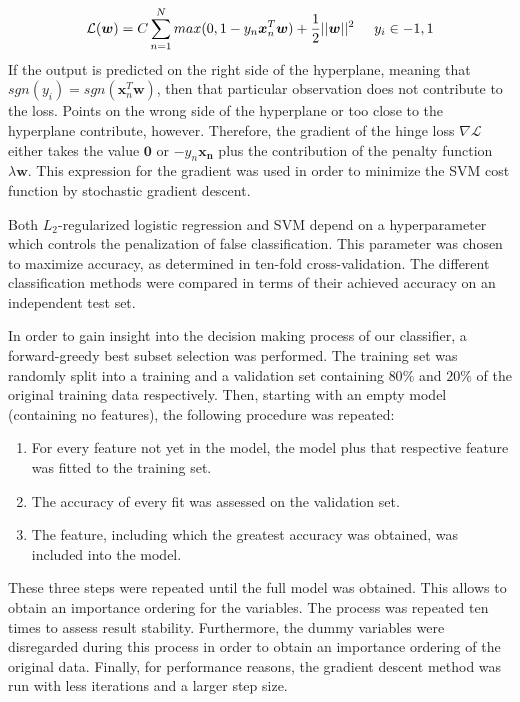 \documentclass[10pt,conference,compsocconf]{IEEEtran}
\begin{document}
\begin{equation}
\mathcal{L}(\boldsymbol{w}) = C \sum_{n=1}^N max(0,1-y_n \boldsymbol{x}_n^T\boldsymbol{w}) + \frac{1}{2}||\boldsymbol{w}||^2 \hspace{5mm} y_i \in {-1,1}
\end{equation}  
If the output is predicted on the right side of the hyperplane, meaning that $sgn(y_i) = sgn(\boldsymbol{x}_n^T\boldsymbol{w})$, then that particular observation does not contribute to the loss. Points on the wrong side of the hyperplane or too close to the hyperplane contribute, however. Therefore, the gradient of the hinge loss $\nabla \mathcal{L}$ either takes the value $\boldsymbol{0}$ or $-y_n\boldsymbol{x_n}$ plus the contribution of the penalty function $\lambda \boldsymbol{w}$. This expression for the gradient was used in order to minimize the SVM cost function by stochastic gradient descent.
\par
Both $L_2$-regularized logistic regression and SVM depend on a hyperparameter which controls the penalization of false classification. This parameter was chosen to maximize accuracy, as determined in ten-fold cross-validation. The different classification methods were compared in terms of their achieved accuracy on an independent test set. %
\par
In order to gain insight into the decision making process of our classifier, a forward-greedy best subset selection was performed. The training set was randomly split into a training and a validation set containing $80\%$ and $20\%$ of the original training data respectively. Then, starting with an empty model (containing no features), the following procedure was repeated: 
\begin{enumerate}
	\item For every feature not yet in the model, the model plus that respective feature was fitted to the training set.
	\item The accuracy of every fit was assessed on the validation set.  
	\item The feature, including which the greatest accuracy was obtained, was included into the model.
\end{enumerate}
These three steps were repeated until the full model was obtained. This allows to obtain an importance ordering for the variables. The process was repeated ten times to assess result stability. Furthermore, the dummy variables were disregarded during this process in order to obtain an importance ordering of the original data. Finally, for performance reasons, the gradient descent method was run with less iterations and a larger step size.
\end{document}
